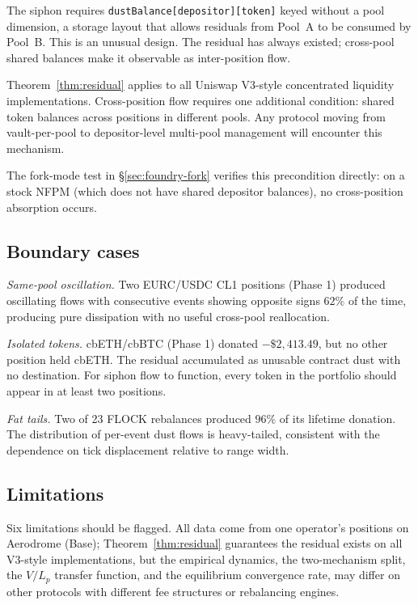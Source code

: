 \documentclass[11pt,a4paper]{article}
\begin{document}
The siphon requires \texttt{dustBalance[depositor][token]} keyed without a pool dimension, a storage layout that allows residuals from Pool~A to be consumed by Pool~B. This is an unusual design. The residual has always existed; cross-pool shared balances make it observable as inter-position flow.

Theorem~\ref{thm:residual} applies to all Uniswap V3-style concentrated liquidity imple\-mentations. Cross-position flow requires one additional condition: shared token balances across positions in different pools. Any protocol moving from vault-per-pool to depositor-level multi-pool management will encounter this mechanism.

The fork-mode test in \S\ref{sec:foundry-fork} verifies this precondition directly: on a stock NFPM (which does not have shared depositor balances), no cross-position absorption occurs.

\subsection{Boundary cases}\label{sec:boundary}

\emph{Same-pool oscillation.} Two EURC/USDC CL1 positions (Phase 1) produced oscillating flows with consecutive events showing opposite signs $62\%$ of the time, producing pure dissipation with no useful cross-pool reallocation.

\emph{Isolated tokens.} cbETH/cbBTC (Phase 1) donated $-\$2{,}413.49$, but no other position held cbETH. The residual accumulated as unusable contract dust with no destination. For siphon flow to function, every token in the portfolio should appear in at least two positions.

\emph{Fat tails.} Two of 23 FLOCK rebalances produced $96\%$ of its lifetime donation. The distribution of per-event dust flows is heavy-tailed, consistent with the dependence on tick displacement relative to range width.

\subsection{Limitations}\label{sec:limitations}

Six limitations should be flagged. All data come from one operator's positions on Aerodrome (Base); Theorem~\ref{thm:residual} guarantees the residual exists on all V3-style implementations, but the empirical dynamics, the two-mechanism split, the $V/L_p$ transfer function, and the equilibrium convergence rate, may differ on other protocols with different fee structures or rebalancing engines.
\end{document}
